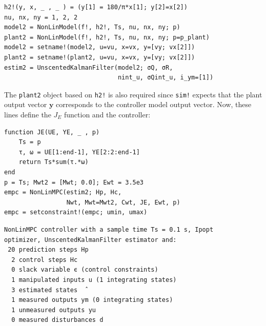 \begin{verbatim}
h2!(y, x, _ , _ ) = (y[1] = 180/π*x[1]; y[2]=x[2])
nu, nx, ny = 1, 2, 2
model2 = NonLinModel(f!, h2!, Ts, nu, nx, ny; p)
plant2 = NonLinModel(f!, h2!, Ts, nu, nx, ny; p=p_plant)
model2 = setname!(model2, u=vu, x=vx, y=[vy; vx[2]])
plant2 = setname!(plant2, u=vu, x=vx, y=[vy; vx[2]])
estim2 = UnscentedKalmanFilter(model2; σQ, σR, 
                               nint_u, σQint_u, i_ym=[1])
\end{verbatim}
The \texttt{plant2} object based on \texttt{h2!} is also required since \texttt{sim!} expects that the plant output vector $\mathbf{y}$ corresponds to the controller model output vector. Now, these lines define the $J_E$ function and the controller:
\begin{verbatim}
function JE(UE, YE, _ , p)
    Ts = p
    τ, ω = UE[1:end-1], YE[2:2:end-1]
    return Ts*sum(τ.*ω)
end
p = Ts; Mwt2 = [Mwt; 0.0]; Ewt = 3.5e3
empc = NonLinMPC(estim2; Hp, Hc, 
                 Nwt, Mwt=Mwt2, Cwt, JE, Ewt, p)
empc = setconstraint!(empc; umin, umax)
\end{verbatim}
\spacerepl
\begin{verbatim}
NonLinMPC controller with a sample time Ts = 0.1 s, Ipopt
optimizer, UnscentedKalmanFilter estimator and:
 20 prediction steps Hp
  2 control steps Hc
  0 slack variable ϵ (control constraints)
  1 manipulated inputs u (1 integrating states)
  3 estimated states  ̂
  1 measured outputs ym (0 integrating states)
  1 unmeasured outputs yu
  0 measured disturbances d
\end{verbatim}

